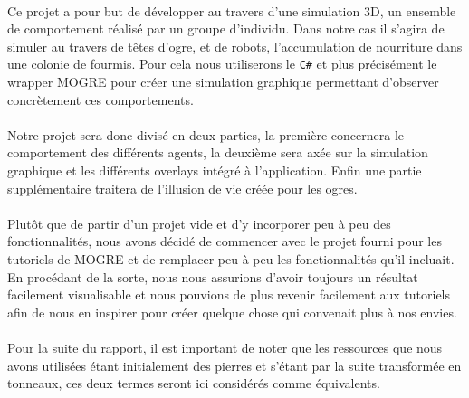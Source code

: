 \paragraph{}
Ce projet a pour but de développer au travers d'une simulation 3D, un
ensemble de comportement réalisé par un groupe d'individu. Dans notre cas il
s'agira de simuler au travers de têtes d'ogre, et de robots, l'accumulation de
nourriture dans une colonie de fourmis. Pour cela nous utiliserons le
\verb!C#! et plus précisément le wrapper MOGRE pour créer une simulation
graphique permettant d'observer concrètement ces comportements.

\paragraph{}

Notre projet sera donc divisé en deux parties, la première concernera 
le comportement des différents agents, la deuxième sera axée sur la simulation
graphique et les différents overlays intégré à l'application. Enfin une partie
supplémentaire traitera de l'illusion de vie créée pour les ogres.

\paragraph{}
Plutôt que de partir d'un projet vide et d'y incorporer peu à peu des
fonctionnalités, nous avons décidé de commencer avec le projet fourni pour
les tutoriels de MOGRE et de remplacer peu à peu les fonctionnalités qu'il
incluait. En procédant de la sorte, nous nous assurions d'avoir toujours un
résultat facilement visualisable et nous pouvions de plus revenir facilement aux
tutoriels afin de nous en inspirer pour créer quelque chose qui convenait plus à
nos envies.

\paragraph{}
Pour la suite du rapport, il est important de noter que les
ressources que nous avons utilisées étant initialement des pierres et s'étant
par la suite transformée en tonneaux, ces deux termes seront ici considérés
comme équivalents.
